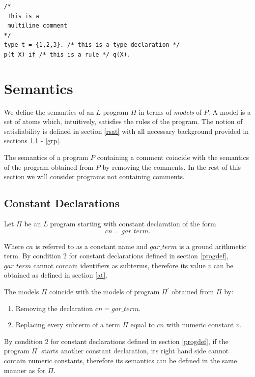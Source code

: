 \documentclass[a4paper,10pt]{article}
\begin{document}
\begin{verbatim}
/*
 This is a
 multiline comment
*/
type t = {1,2,3}. /* this is a type declaration */
p(t X) if /* this is a rule */ q(X). 
\end{verbatim}


\section{Semantics}
We define the semantics of an $L$ program $\Pi$ in terms of \textit{models} of $P$. A model is a set of atoms which, intuitively, satisfies the rules of the program. The notion of satisfiability is defined in section \ref{rsat} with all necessary background provided in sections 
\ref{constants} - \ref{grp}.

The semantics of a program $P$ containing a comment coincide with the semantics of the program obtained from $P$ by removing the comments. In the rest of this section we will consider programs not containing comments.




\subsection{Constant Declarations} \label{constants}


Let $\Pi$ be an $L$ program starting with constant declaration of the form
$$cn = gar\_term.$$

Where $cn$ is referred to as a constant name and $gar\_term$ is a ground arithmetic term.
By condition 2 for constant declarations defined in section \ref{progdef}, $gar\_term$ cannot contain identifiers as subterms,
therefore its value $v$ can be obtained as defined in section \ref{at}. 

The models $\Pi$ coincide with the models of program $\Pi^\prime$ obtained from $\Pi$ by:
\begin{enumerate}
\item Removing the declaration $cn = gar\_term.$
\item Replacing every subterm of a term $\Pi$ equal to $cn$ with numeric constant $v$. 
\end{enumerate} 


\medskip\noindent
By condition 2 for constant declarations defined in section \ref{progdef}, if the program $\Pi^\prime$ starts another constant declaration, its right hand side cannot contain numeric constants, therefore its semantics can be defined in the same manner as for $\Pi$.
 
\end{document}
